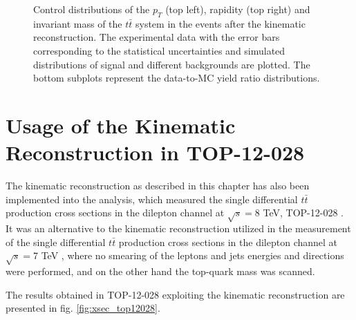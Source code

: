 \begin{figure}[h]
\begin{subfigure}
\end{subfigure}
\caption{Control distributions of the $p_{T}$ (top left), rapidity (top right) and invariant mass of the $t\bar{t}$ system in the events 
 after the kinematic reconstruction. The experimental data with the error bars corresponding to the statistical uncertainties
 and simulated distributions of signal and different backgrounds are plotted. The bottom subplots represent the data-to-MC yield ratio distributions.}
\label{fig:CPkinTTbar}
\end{figure}

\section{Usage of the Kinematic Reconstruction in TOP-12-028}

The kinematic reconstruction as described in this chapter has also been implemented into the analysis, which measured the single differential $t\bar{t}$
production cross sections in the dilepton channel at $\sqrt{s} = $8 TeV, TOP-12-028 \cite{TWikiTOP12028} \cite{Khachatryan:2015oqa}. 
It was an alternative to the kinematic reconstruction utilized in the measurement of the single differential $t\bar{t}$
production cross sections in the dilepton channel at $\sqrt{s} = $7 TeV \cite{Chatrchyan:2012saa}, where no smearing of the leptons and 
jets energies and directions were performed, and on the other hand the top-quark mass was scanned.

The results obtained in TOP-12-028 exploiting the kinematic reconstruction are presented in fig. \ref{fig:xsec_top12028}.

